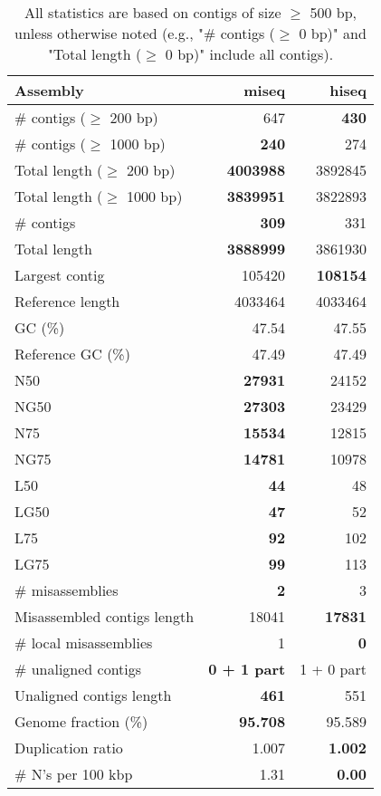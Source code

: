 \documentclass[12pt,a4paper]{article}
\begin{document}
\begin{table}[ht]
\begin{center}
\caption{All statistics are based on contigs of size $\geq$ 500 bp, unless otherwise noted (e.g., "\# contigs ($\geq$ 0 bp)" and "Total length ($\geq$ 0 bp)" include all contigs).}
\begin{tabular}{|l*{2}{|r}|}
\hline
Assembly & miseq & hiseq \\ \hline
\# contigs ($\geq$ 200 bp) & 647 & {\bf 430} \\ \hline
\# contigs ($\geq$ 1000 bp) & {\bf 240} & 274 \\ \hline
Total length ($\geq$ 200 bp) & {\bf 4003988} & 3892845 \\ \hline
Total length ($\geq$ 1000 bp) & {\bf 3839951} & 3822893 \\ \hline
\# contigs & {\bf 309} & 331 \\ \hline
Total length & {\bf 3888999} & 3861930 \\ \hline
Largest contig & 105420 & {\bf 108154} \\ \hline
Reference length & 4033464 & 4033464 \\ \hline
GC (\%) & 47.54 & 47.55 \\ \hline
Reference GC (\%) & 47.49 & 47.49 \\ \hline
N50 & {\bf 27931} & 24152 \\ \hline
NG50 & {\bf 27303} & 23429 \\ \hline
N75 & {\bf 15534} & 12815 \\ \hline
NG75 & {\bf 14781} & 10978 \\ \hline
L50 & {\bf 44} & 48 \\ \hline
LG50 & {\bf 47} & 52 \\ \hline
L75 & {\bf 92} & 102 \\ \hline
LG75 & {\bf 99} & 113 \\ \hline
\# misassemblies & {\bf 2} & 3 \\ \hline
Misassembled contigs length & 18041 & {\bf 17831} \\ \hline
\# local misassemblies & 1 & {\bf 0} \\ \hline
\# unaligned contigs & {\bf 0 + 1 part} & 1 + 0 part \\ \hline
Unaligned contigs length & {\bf 461} & 551 \\ \hline
Genome fraction (\%) & {\bf 95.708} & 95.589 \\ \hline
Duplication ratio & 1.007 & {\bf 1.002} \\ \hline
\# N's per 100 kbp & 1.31 & {\bf 0.00} \\ \hline

\end{tabular}
\end{center}
\end{table}
\end{document}
